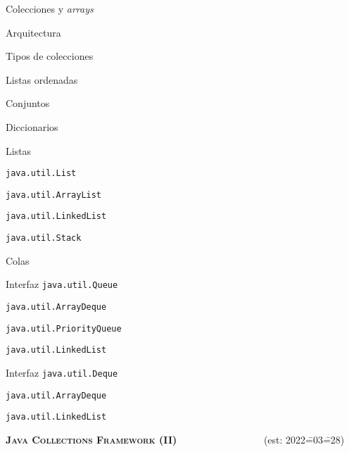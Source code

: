\begin{longenum}
\begin{longenum}
        \item Colecciones y \textit{arrays}
        \item Arquitectura
        \item Tipos de colecciones
        \begin{longenum}
            \item Listas ordenadas
            \item Conjuntos
            \item Diccionarios
        \end{longenum}
        \item Listas
        \begin{longenum}
            \item \texttt{java.util.List}
            \begin{longenum}
                \item \texttt{java.util.ArrayList}
                \item \texttt{java.util.LinkedList}
                \item \texttt{java.util.Stack}
            \end{longenum}
        \end{longenum}
        \item Colas
        \begin{longenum}
            \item Interfaz \texttt{java.util.Queue}
            \begin{longenum}
                \item \texttt{java.util.ArrayDeque}
                \item \texttt{java.util.PriorityQueue}
                \item \texttt{java.util.LinkedList}
            \end{longenum}
            \item Interfaz \texttt{java.util.Deque}
            \begin{longenum}
                \item \texttt{java.util.ArrayDeque}
                \item \texttt{java.util.LinkedList}
            \end{longenum}
        \end{longenum}
    \end{longenum}
    \item \textbf{\textsc{Java Collections Framework (II)}} \ \ \ \ \ \ \ \ \ \ \ \ \ \ \ \ \ (est: 2022\==03\==28)

\end{longenum}
